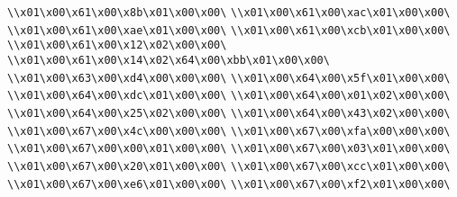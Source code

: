 \verb|\\x01\x00\x61\x00\x8b\x01\x00\x00\|\newline
\verb|\\x01\x00\x61\x00\xac\x01\x00\x00\|\newline
\verb|\\x01\x00\x61\x00\xae\x01\x00\x00\|\newline
\verb|\\x01\x00\x61\x00\xcb\x01\x00\x00\|\newline
\verb|\\x01\x00\x61\x00\x12\x02\x00\x00\|\newline
\verb|\\x01\x00\x61\x00\x14\x02\x64\x00\xbb\x01\x00\x00\|\newline
\verb|\\x01\x00\x63\x00\xd4\x00\x00\x00\|\newline
\verb|\\x01\x00\x64\x00\x5f\x01\x00\x00\|\newline
\verb|\\x01\x00\x64\x00\xdc\x01\x00\x00\|\newline
\verb|\\x01\x00\x64\x00\x01\x02\x00\x00\|\newline
\verb|\\x01\x00\x64\x00\x25\x02\x00\x00\|\newline
\verb|\\x01\x00\x64\x00\x43\x02\x00\x00\|\newline
\verb|\\x01\x00\x67\x00\x4c\x00\x00\x00\|\newline
\verb|\\x01\x00\x67\x00\xfa\x00\x00\x00\|\newline
\verb|\\x01\x00\x67\x00\x00\x01\x00\x00\|\newline
\verb|\\x01\x00\x67\x00\x03\x01\x00\x00\|\newline
\verb|\\x01\x00\x67\x00\x20\x01\x00\x00\|\newline
\verb|\\x01\x00\x67\x00\xcc\x01\x00\x00\|\newline
\verb|\\x01\x00\x67\x00\xe6\x01\x00\x00\|\newline
\verb|\\x01\x00\x67\x00\xf2\x01\x00\x00\|\newline
